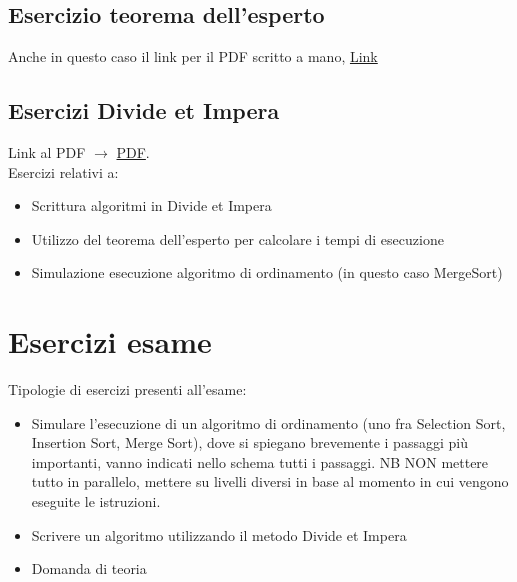\subsection{Esercizio teorema dell'esperto}
Anche in questo caso il link per il PDF scritto a mano,
\href{https://drive.google.com/file/d/1aDfCN6H7dskDnQHP-jPJcsS9lYL16XWT/view?usp=sharing}{Link}
\subsection{Esercizi Divide et Impera}
Link al PDF $\rightarrow$
\href{https://drive.google.com/file/d/1uE9Qx0KQFS79spWmqmrkDph0iVdfbZnz/view?usp=sharing}{PDF}.\\
Esercizi relativi a:
\begin{itemize}
    \item Scrittura algoritmi in Divide et Impera
    \item Utilizzo del teorema dell'esperto per calcolare i tempi di esecuzione
    \item Simulazione esecuzione algoritmo di ordinamento (in questo caso MergeSort)
\end{itemize}
\section{Esercizi esame}
Tipologie di esercizi presenti all'esame:
\begin{itemize}
    \item Simulare l'esecuzione di un algoritmo di ordinamento (uno fra Selection Sort, 
    Insertion Sort, Merge Sort), dove si spiegano brevemente i passaggi più importanti,
    vanno indicati nello schema tutti i passaggi. NB NON mettere tutto in parallelo, mettere su livelli
    diversi in base al momento in cui vengono eseguite le istruzioni.
    \item Scrivere un algoritmo utilizzando il metodo Divide et Impera
    \item Domanda di teoria
\end{itemize}

